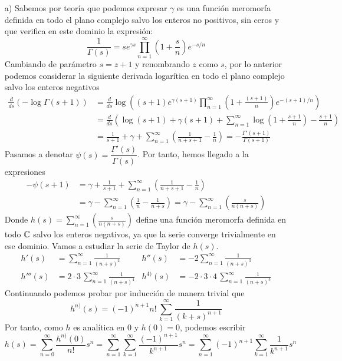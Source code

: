 \documentclass[twoside]{article}
\begin{document}
\begin{sol}
\begin{itemize}
\item[]
\item[a)] Sabemos por teoría que podemos expresar $\gamma$ es una función meromorfa definida en todo el plano complejo salvo los enteros no positivos, sin ceros y que verifica en este dominio la expresión:
\[ \frac{1}{Γ(s)} = s e^{γs} \prod_{n=1}^{∞} \left(1 + \frac{s}{n}\right) e^{-s/n} \]
Cambiando de parámetro $s=z+1$ y renombrando $z$ como $s$, por lo anterior podemos considerar la siguiente derivada logarítica en todo el plano complejo salvo los enteros negativos
\begin{align*}
\frac{d}{ds}\left(-\log \Gamma(s+1)\right) &=  \frac{d}{ds}\log\left((s+1) e^{γ(s+1)} \prod_{n=1}^{∞} \left(1 + \frac{(s+1)}{n}\right) e^{-(s+1)/n}\right)\\
&= \frac{d}{ds}\left( \log(s+1)+\gamma(s+1)+\sum_{n=1}^\infty \log\left(1+\frac{s+1}{n}\right)-\frac{s+1}{n}\right)\\
&= \frac{1}{s+1} +\gamma + \sum_{n=1}^\infty \left(\frac{1}{n+s+1}-\frac{1}{n}\right) = -\frac{\Gamma'(s+1)}{\Gamma(s+1)}
\end{align*}
Pasamos a denotar $\psi(s) = \dfrac{\Gamma'(s)}{\Gamma(s)}$. Por tanto, hemos llegado a la expresiones
\begin{align*}
-\psi(s+1) &= \gamma+\frac{1}{s+1} + \sum_{n=1}^\infty \left(\frac{1}{n+s+1}-\frac{1}{n}\right)\\
& = \gamma -\sum_{n=1}^\infty \left(\frac{1}{n} - \frac{1}{n+s}\right) = \gamma -\sum_{n=1}^\infty \left(\frac{s}{n(n+s)}\right) 
\end{align*}
Donde $h(s)=\sum_{n=1}^\infty \left(\frac{s}{n(n+s)}\right)$ define una función meromorfa definida en todo $\mathbb{C}$ salvo los enteros negativos, ya que la serie converge trivialmente en ese dominio. Vamos a estudiar la serie de Taylor de $h(s)$.
\begin{align*}
h'(s) & = \sum_{n=1}^\infty\frac{1}{(n+s)^2} & h''(s)&=  -2\sum_{n=1}^\infty\frac{1}{(n+s)^3}\\
h'''(s) &= 2 \cdot 3 \, \sum_{n=1}^\infty\frac{1}{(n+s)^4} &  h^{4)}(s) &= -2 \cdot 3 \cdot 4 \,\sum_{n=1}^\infty\frac{1}{(n+s)^5}
\end{align*}
Continuando podemos probar por inducción de manera trivial que
$$h^{n)}(s) = (-1)^{n+1}n!\,\sum_{k=1}^\infty\frac{1}{(k+s)^{n+1}}$$
Por tanto, como $h$ es analítica en $0$ y $h(0)=0$, podemos escribir
$$
h(s)=\sum_{n=0}^\infty \frac{h^{n)}(0)}{n!}s^n = \sum_{n=1}^\infty\sum_{k=1}^\infty\frac{(-1)^{n+1}}{k^{n+1}}  s^n = \sum_{n=1}^\infty(-1)^{n+1}\sum_{k=1}^\infty\frac{1}{k^{n+1}}  s^n 
$$
\end{itemize}
\end{sol}
\end{document}
